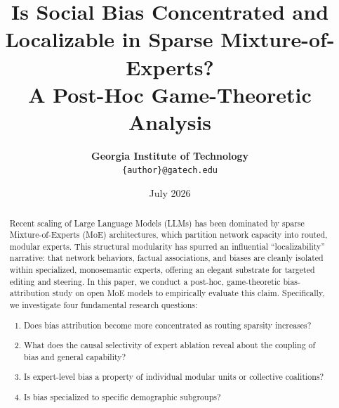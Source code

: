\documentclass[11pt,a4paper]{article}
\title{\textbf{Is Social Bias Concentrated and Localizable in Sparse Mixture-of-Experts?\\A Post-Hoc Game-Theoretic Analysis}}
\author{\textbf{Georgia Institute of Technology} \\ \texttt{\{author\}@gatech.edu}}
\date{July 2026}
\begin{document}
\maketitle

\begin{abstract}
Recent scaling of Large Language Models (LLMs) has been dominated by sparse Mixture-of-Experts (MoE) architectures, which partition network capacity into routed, modular experts. This structural modularity has spurred an influential ``localizability'' narrative: that network behaviors, factual associations, and biases are cleanly isolated within specialized, monosemantic experts, offering an elegant substrate for targeted editing and steering. In this paper, we conduct a post-hoc, game-theoretic bias-attribution study on open MoE models to empirically evaluate this claim. Specifically, we investigate four fundamental research questions:
\begin{enumerate}
    \item Does bias attribution become more concentrated as routing sparsity increases?
    \item What does the causal selectivity of expert ablation reveal about the coupling of bias and general capability?
    \item Is expert-level bias a property of individual modular units or collective coalitions?
    \item Is bias specialized to specific demographic subgroups?
\end{enumerate}


\end{abstract}
\end{document}

